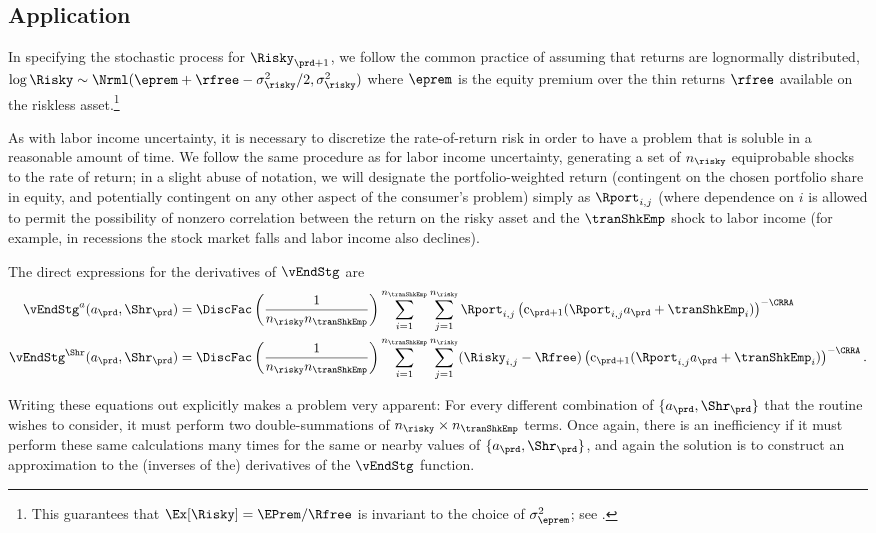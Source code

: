 \documentclass[titlepage, headings=optiontotocandhead]{econtex}
\begin{document}
\subsection{Application}\label{subsec:MCApplication}


In specifying the stochastic process for $\Risky_{\prd+1}$, we follow the common practice of assuming that returns are lognormally distributed, $\log \Risky \sim \Nrml(\eprem+\rfree-\sigma^{2}_{\risky}/2,\sigma^{2}_{\risky})$ where $\eprem$ is the equity premium over the thin returns $\rfree$ available on the riskless asset.\footnote{This guarantees that $\Ex[\Risky] = \EPrem/\Rfree$ is invariant to the choice of $\sigma^{2}_{\eprem}$; see .}

As with labor income uncertainty, it is necessary to discretize the rate-of-return risk in order to have a problem that is soluble in a reasonable amount of time.  We follow the same procedure as for labor income uncertainty, generating a set of $n_{\risky}$ equiprobable shocks to the rate of return; in a slight abuse of notation, we will designate the portfolio-weighted return (contingent on the chosen portfolio share in equity, and potentially contingent on any other aspect of the consumer's problem) simply as $\Rport_{i,j}$ (where dependence on $i$ is allowed to permit the possibility of nonzero correlation between the return on the risky asset and the $\tranShkEmp$ shock to labor income (for example, in recessions the stock market falls and labor income also declines).

The direct expressions for the derivatives of $\vEndStg$ are
\begin{equation}\begin{gathered}\begin{aligned}
      \vEndStg^{a}(a_{\prd},\Shr_{\prd})  & = \DiscFac \left(\frac{1}{n_{\risky} n_{\tranShkEmp}}\right)\sum_{i=1}^{n_{\tranShkEmp}}\sum_{j=1}^{n_{\risky} }\Rport_{i,j} \left(\mathrm{c}_{\prd+1}(\Rport_{i,j}a_{\prd}+\tranShkEmp_{i})\right)^{-\CRRA}
      \\      \vEndStg^{\Shr}(a_{\prd},\Shr_{\prd})  & = \DiscFac \left(\frac{1}{n_{\risky} n_{\tranShkEmp}}\right)\sum_{i=1}^{n_{\tranShkEmp}}\sum_{j=1}^{n_{\risky} }(\Risky_{i,j}-\Rfree)\left(\mathrm{c}_{\prd+1}(\Rport_{i,j}a_{\prd}+\tranShkEmp_{i})\right)^{-\CRRA}.
    \end{aligned}\end{gathered}\end{equation}

Writing these equations out explicitly makes a problem very apparent: For every different combination of $\{{a}_{\prd},\Shr_{\prd}\}$ that the routine wishes to consider, it must perform two double-summations of $n_{\risky} \times n_{\tranShkEmp}$ terms.  Once again, there is an inefficiency if it must perform these same calculations many times for the same or nearby values of $\{{a}_{\prd},\Shr_{\prd}\}$, and again the solution is to construct an approximation to the (inverses of the) derivatives of the $\vEndStg$ function.
\end{document}

